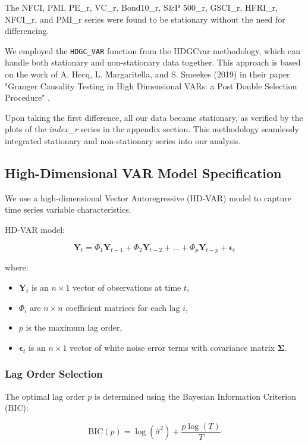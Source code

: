 \documentclass[12pt]{article}
\begin{document}
The NFCI, PMI, PE\_r, VC\_r, Bond10\_r, S\&P 500\_r, GSCI\_r, HFRI\_r, NFCI\_r, and PMI\_r series were found to be stationary without the need for differencing.

We employed the \texttt{HDGC\_VAR} function from the HDGCvar methodology, which can handle both stationary and non-stationary data together. This approach is based on the work of A. Hecq, L. Margaritella, and S. Smeekes (2019) in their paper "Granger Causality Testing in High Dimensional VARs: a Post Double Selection Procedure" \cite{Hecq2019}. 

Upon taking the first difference, all our data became stationary, as verified by the plots of the \textit{index\_r} series in the appendix section. This methodology seamlessly integrated stationary and non-stationary series into our analysis.




\subsection{High-Dimensional VAR Model Specification}
We use a high-dimensional Vector Autoregressive (HD-VAR) model to capture time series variable characteristics. 

 HD-VAR model:

\[
\mathbf{Y}_t = \Phi_1 \mathbf{Y}_{t-1} + \Phi_2 \mathbf{Y}_{t-2} + \ldots + \Phi_p \mathbf{Y}_{t-p} + \boldsymbol{\epsilon}_t
\]

where:
\begin{itemize}
    \item \(\mathbf{Y}_t\) is an \(n \times 1\) vector of observations at time \(t\),
    \item \(\Phi_i\) are \(n \times n\) coefficient matrices for each lag \(i\),
    \item \(p\) is the maximum lag order,
    \item \(\boldsymbol{\epsilon}_t\) is an \(n \times 1\) vector of white noise error terms with covariance matrix \(\mathbf{\Sigma}\).
\end{itemize}

\subsubsection{Lag Order Selection}

The optimal lag order \(p\) is determined using the Bayesian Information Criterion (BIC):

\[
\text{BIC}(p) = \log(\hat{\sigma}^2) + \frac{p \log(T)}{T}
\]
\end{document}
